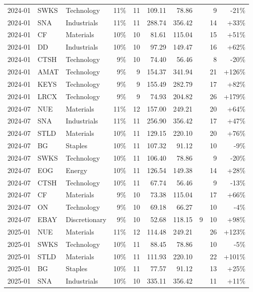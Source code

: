 \documentclass[11pt,a4paper]{article}
\begin{document}
{\begin{longtable}{l l l r r r r r r r}
2024-01 & SWKS & Technology & 11\% & 11 & 109.11 & 78.86 &  & 9 & -21\% \\
2024-01 & SNA & Industrials & 11\% & 11 & 288.74 & 356.42 &  & 14 & +33\% \\
2024-01 & CF & Materials & 10\% & 10 & 81.61 & 115.04 &  & 15 & +51\% \\
2024-01 & DD & Industrials & 10\% & 10 & 97.29 & 149.47 &  & 16 & +62\% \\
2024-01 & CTSH & Technology & 9\% & 10 & 74.40 & 56.46 &  & 8 & -20\% \\
2024-01 & AMAT & Technology & 9\% & 9 & 154.37 & 341.94 &  & 21 & +126\% \\
2024-01 & KEYS & Technology & 9\% & 9 & 155.49 & 282.79 &  & 17 & +82\% \\
2024-01 & LRCX & Technology & 9\% & 9 & 74.93 & 204.82 &  & 26 & +179\% \\
2024-07 & NUE & Materials & 11\% & 12 & 157.00 & 249.21 &  & 20 & +64\% \\
2024-07 & SNA & Industrials & 11\% & 11 & 256.90 & 356.42 &  & 17 & +47\% \\
2024-07 & STLD & Materials & 10\% & 11 & 129.15 & 220.10 &  & 20 & +76\% \\
2024-07 & BG & Staples & 10\% & 11 & 107.32 & 91.12 &  & 10 & -9\% \\
2024-07 & SWKS & Technology & 10\% & 11 & 106.40 & 78.86 &  & 9 & -20\% \\
2024-07 & EOG & Energy & 10\% & 11 & 126.54 & 149.38 &  & 14 & +28\% \\
2024-07 & CTSH & Technology & 10\% & 11 & 67.74 & 56.46 &  & 9 & -13\% \\
2024-07 & CF & Materials & 9\% & 10 & 73.38 & 115.04 &  & 17 & +66\% \\
2024-07 & ON & Technology & 9\% & 10 & 69.18 & 66.27 &  & 10 & -4\% \\
2024-07 & EBAY & Discretionary & 9\% & 10 & 52.68 & 118.15 & 9 & 10 & +98\% \\
2025-01 & NUE & Materials & 11\% & 12 & 114.48 & 249.21 &  & 26 & +123\% \\
2025-01 & SWKS & Technology & 10\% & 11 & 88.45 & 78.86 &  & 10 & -5\% \\
2025-01 & STLD & Materials & 10\% & 11 & 111.93 & 220.10 &  & 22 & +101\% \\
2025-01 & BG & Staples & 10\% & 11 & 77.57 & 91.12 &  & 13 & +25\% \\
2025-01 & SNA & Industrials & 10\% & 10 & 335.11 & 356.42 &  & 11 & +11\% \\

\end{longtable}}
\end{document}
